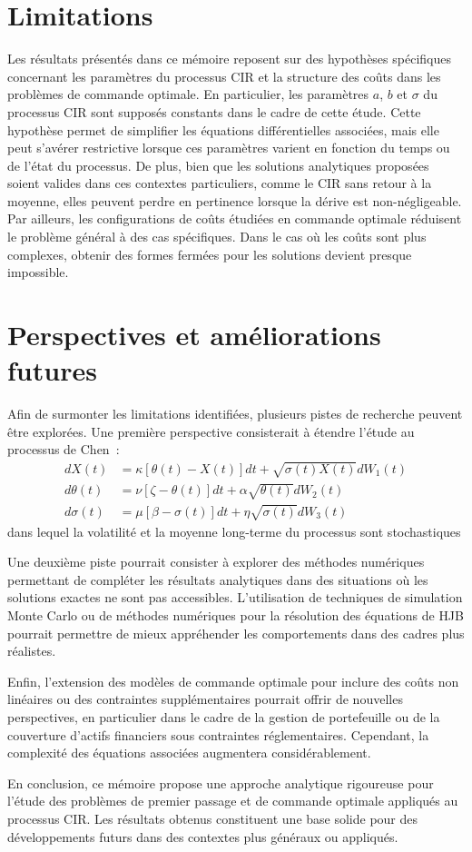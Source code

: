 \section{Limitations}

Les résultats présentés dans ce mémoire reposent sur des hypothèses spécifiques concernant les paramètres du processus CIR et la structure des coûts dans les problèmes de commande optimale. En particulier, les paramètres \(a\), \(b\) et \(\sigma\) du processus \acs{CIR} sont supposés constants dans le cadre de cette étude. Cette hypothèse permet de simplifier les équations différentielles associées, mais elle peut s'avérer restrictive lorsque ces paramètres varient en fonction du temps ou de l'état du processus. De plus, bien que les solutions analytiques proposées soient valides dans ces contextes particuliers, comme le \acs{CIR} sans retour à la moyenne, elles peuvent perdre en pertinence lorsque la dérive est non-négligeable. Par ailleurs, les configurations de coûts étudiées en commande optimale réduisent le problème général à des cas spécifiques. Dans le cas où les coûts sont plus complexes, obtenir des formes fermées pour les solutions devient presque impossible.

\section{Perspectives et améliorations futures}

Afin de surmonter les limitations identifiées, plusieurs pistes de recherche peuvent être explorées. Une première perspective consisterait à étendre l'étude au processus de Chen~\cite{chen1996}:
\[
\begin{aligned}
    dX(t) &= \kappa[\theta(t)-X(t)]dt+\sqrt{\sigma(t)X(t)}dW_1(t) \\
    d\theta(t) &= \nu[\zeta-\theta(t)]dt+\alpha\sqrt{\theta(t)}dW_2(t) \\
    d\sigma(t) &= \mu[\beta-\sigma(t)]dt+\eta\sqrt{\sigma(t)}dW_3(t)
\end{aligned}
\]
dans lequel la volatilité et la moyenne long-terme du processus sont stochastiques

Une deuxième piste pourrait consister à explorer des méthodes numériques permettant de compléter les résultats analytiques dans des situations où les solutions exactes ne sont pas accessibles. L'utilisation de techniques de simulation Monte Carlo ou de méthodes numériques pour la résolution des équations de \acs{HJB} pourrait permettre de mieux appréhender les comportements dans des cadres plus réalistes.

Enfin, l'extension des modèles de commande optimale pour inclure des coûts non linéaires ou des contraintes supplémentaires pourrait offrir de nouvelles perspectives, en particulier dans le cadre de la gestion de portefeuille ou de la couverture d'actifs financiers sous contraintes réglementaires. Cependant, la complexité des équations associées augmentera considérablement.

En conclusion, ce mémoire propose une approche analytique rigoureuse pour l'étude des problèmes de premier passage et de commande optimale appliqués au processus \acs{CIR}. Les résultats obtenus constituent une base solide pour des développements futurs dans des contextes plus généraux ou appliqués.